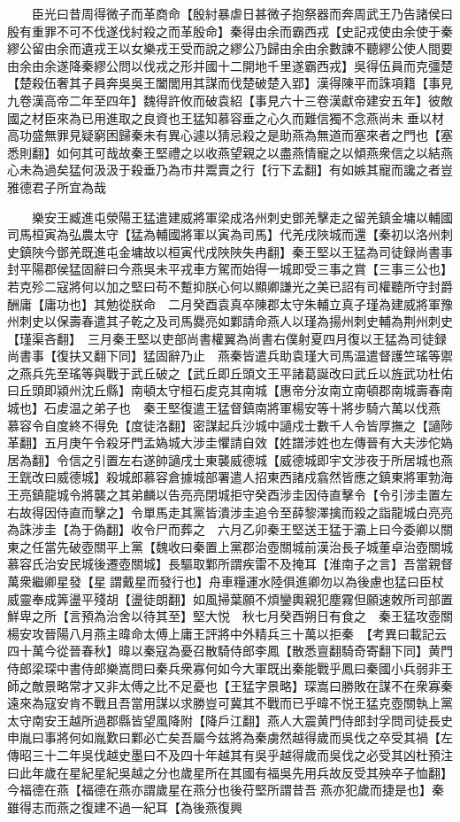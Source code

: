 　　臣光曰昔周得微子而革商命【殷紂暴虐日甚微子抱祭器而奔周武王乃告諸侯曰殷有重罪不可不伐遂伐紂殺之而革殷命】秦得由余而霸西戎【史記戎使由余使于秦繆公留由余而遺戎王以女樂戎王受而說之繆公乃歸由余由余數諫不聽繆公使人間要由余由余遂降秦繆公問以伐戎之形并國十二開地千里遂霸西戎】吳得伍員而克彊楚【楚殺伍奢其子員奔吳吳王闔閭用其謀而伐楚破楚入郢】漢得陳平而誅項籍【事見九卷漢高帝二年至四年】魏得許攸而破袁紹【事見六十三卷漢獻帝建安五年】彼敵國之材臣來為已用進取之良資也王猛知慕容垂之心久而難信獨不念燕尚未垂以材高功盛無罪見疑窮困歸秦未有異心遽以猜忌殺之是助燕為無道而塞來者之門也【塞悉則翻】如何其可哉故秦王堅禮之以收燕望親之以盡燕情寵之以傾燕衆信之以結燕心未為過矣猛何汲汲于殺垂乃為市井鬻賣之行【行下孟翻】有如嫉其寵而讒之者豈雅德君子所宜為哉

　　樂安王臧進屯滎陽王猛遣建威將軍梁成洛州刺史鄧羌擊走之留羌鎮金墉以輔國司馬桓寅為弘農太守【猛為輔國將軍以寅為司馬】代羌戌陜城而還【秦初以洛州刺史鎮陜今鄧羌既進屯金墉故以桓寅代戌陜陜失冉翻】秦王堅以王猛為司徒録尚書事封平陽郡侯猛固辭曰今燕吳未平戎車方駕而始得一城即受三事之賞【三事三公也】若克殄二寇將何以加之堅曰苟不蹔抑朕心何以顯卿謙光之美已詔有司權聽所守封爵酬庸【庸功也】其勉從朕命　二月癸酉袁真卒陳郡太守朱輔立真子瑾為建威將軍豫州刺史以保壽春遣其子乾之及司馬爨亮如鄴請命燕人以瑾為揚州刺史輔為荆州刺史【瑾渠吝翻】　三月秦王堅以吏部尚書權翼為尚書右僕射夏四月復以王猛為司徒録尚書事【復扶又翻下同】猛固辭乃止　燕秦皆遣兵助袁瑾大司馬温遣督護竺瑤等禦之燕兵先至瑤等與戰于武丘破之【武丘即丘頭文王平諸葛誕改曰武丘以旌武功杜佑曰丘頭即潁州沈丘縣】南頓太守桓石䖍克其南城【惠帝分汝南立南頓郡南城壽春南城也】石䖍温之弟子也　秦王堅復遣王猛督鎮南將軍楊安等十將步騎六萬以伐燕　慕容令自度終不得免【度徒洛翻】密謀起兵沙城中讁戍士數千人令皆厚撫之【讁陟革翻】五月庚午令殺牙門孟媯城大涉圭懼請自效【姓譜涉姓也左傳晉有大夫涉佗媯居為翻】令信之引置左右遂帥讁戌士東襲威德城【威德城即宇文涉夜于所居城也燕王皝改曰威德城】殺城郎慕容倉據城部署遣人招東西諸戍翕然皆應之鎮東將軍勃海王亮鎮龍城令將襲之其弟麟以告亮亮閉城拒守癸酉涉圭因侍直擊令【令引涉圭置左右故得因侍直而擊之】令單馬走其黨皆潰涉圭追令至薛黎澤擒而殺之詣龍城白亮亮為誅涉圭【為于偽翻】收令尸而葬之　六月乙卯秦王堅送王猛于灞上曰今委卿以關東之任當先破壺關平上黨【魏收曰秦置上黨郡治壺關城前漢治長子城董卓治壺關城慕容氏治安民城後遷壺關城】長驅取鄴所謂疾雷不及掩耳【淮南子之言】吾當親督萬衆繼卿星發【星謂戴星而發行也】舟車糧運水陸俱進卿勿以為後慮也猛曰臣杖威靈奉成筭盪平殘胡【盪徒朗翻】如風掃葉願不煩鑾輿親犯塵霧但願速敇所司部置鮮卑之所【言預為治舍以待其至】堅大悦　秋七月癸酉朔日有食之　秦王猛攻壺關楊安攻晉陽八月燕主暐命太傅上庸王評將中外精兵三十萬以拒秦　【考異曰載記云四十萬今從晉春秋】暐以秦寇為憂召散騎侍郎李鳳【散悉亶翻騎奇寄翻下同】黄門侍郎梁琛中書侍郎樂嵩問曰秦兵衆寡何如今大軍既出秦能戰乎鳳曰秦國小兵弱非王師之敵景略常才又非太傅之比不足憂也【王猛字景略】琛嵩曰勝敗在謀不在衆寡秦遠來為寇安肯不戰且吾當用謀以求勝豈可冀其不戰而已乎暐不悦王猛克壺關執上黨太守南安王越所過郡縣皆望風降附【降戶江翻】燕人大震黄門侍郎封孚問司徒長史申胤曰事將何如胤歎曰鄴必亡矣吾屬今兹將為秦虜然越得歲而吳伐之卒受其禍【左傳昭三十二年吳伐越史墨曰不及四十年越其有吳乎越得歲而吳伐之必受其凶杜預注曰此年歲在星紀星紀吳越之分也歲星所在其國有福吳先用兵故反受其殃卒子恤翻】今福德在燕【福德在燕亦謂歲星在燕分也後苻堅所謂昔吾燕亦犯歲而捷是也】秦雖得志而燕之復建不過一紀耳【為後燕復興